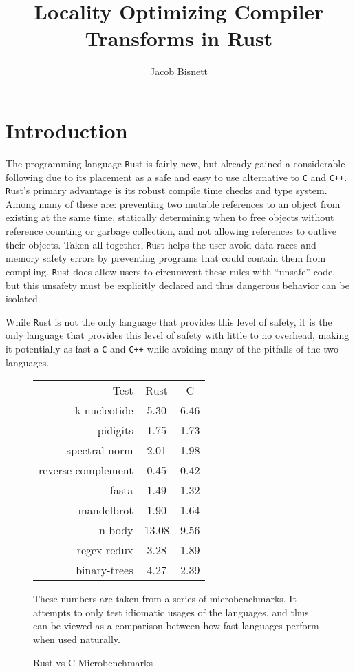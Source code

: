 \documentclass[12pt,final]{article}
\newcommand{\rustname}{{\texttt Rust}}
\def \rust {\rustname{}\xspace}
\newcommand{\cname}{{\texttt{C}}}
\def \c {\cname{}\xspace}
\newcommand{\cppname}{{\texttt{C++}}}
\def \cpp {\cppname{}\xspace}
\begin{document}
\title{Locality Optimizing Compiler Transforms in Rust}
\author{Jacob Bisnett}
\maketitle

\section{Introduction}
\label{sec:intro}

The programming language \rust is fairly new, but already gained a considerable
following due to its placement as a safe and easy to use alternative to \c and
\cpp. \rust's primary advantage is its robust compile time checks and type
system. Among many of these are:
preventing two mutable references to an object from existing at the same time, 
statically determining when to free objects without reference counting or
garbage collection,
and not allowing references to outlive their objects.
Taken all together, \rust helps the user avoid data races and memory safety
errors by preventing programs that could contain them from compiling.
\rust does allow users to circumvent these rules with ``unsafe'' code,
but this unsafety must be explicitly declared and thus dangerous behavior can be
isolated.


While \rust is not the only language that provides this level of safety, it is
the only language that provides this level of safety with little to no overhead,
making it potentially as fast a \c and \cpp while avoiding many of the
pitfalls of the two languages.

\begin{figure}
  \centering
\begin{tabular}{r|c|c}
  Test&Rust&C\\
  k-nucleotide&5.30&6.46\\
  pidigits&1.75&1.73\\
  spectral-norm&2.01&1.98\\
  reverse-complement&0.45&0.42\\
  fasta&1.49&1.32\\
  mandelbrot&1.90&1.64\\
  n-body&13.08&9.56\\
  regex-redux&3.28&1.89\\
  binary-trees&4.27&2.39\\
\end{tabular}
  \caption{Rust vs C Microbenchmarks}
  These numbers are taken from a series of microbenchmarks. It attempts to only
  test idiomatic usages of the languages, and thus can be viewed as a comparison
  between how fast languages perform when used naturally.\cite{bench}
  \label{fig:bench}
\end{figure}
\end{document}
